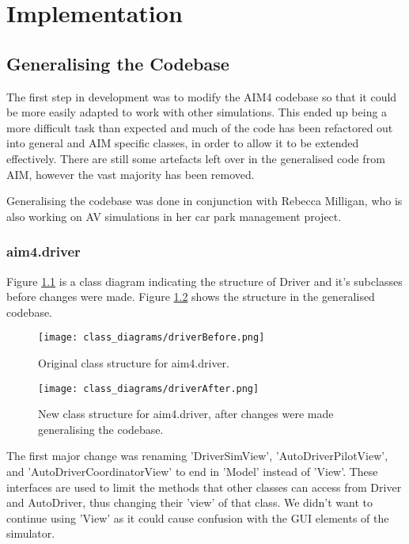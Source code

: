 \chapter{Implementation}
\label{cha:Implementation}

\section{Generalising the Codebase}
\label{sec:Generalising the Codebase}
The first step in development was to modify the AIM4 codebase so that it could be more easily adapted to work with other simulations. This ended up being a more difficult task than expected and much of the code has been refactored out into general and AIM specific classes, in order to allow it to be extended effectively. There are still some artefacts left over in the generalised code from AIM, however the vast majority has been removed. 

Generalising the codebase was done in conjunction with Rebecca Milligan, who is also working on AV simulations in her car park management project.

\subsection{aim4.driver}
\label{subsec:aim4.driver}
Figure \ref{fig:driverBefore} is a class diagram indicating the structure of Driver and it's subclasses before changes were made. Figure \ref{fig:driverAfter} shows the structure in the generalised codebase.

\begin{figure}[htb]
\texttt{[image: class\_diagrams/driverBefore.png]}
\caption{Original class structure for aim4.driver.}
\label{fig:driverBefore}
\end{figure}

\begin{figure}[htb]
\texttt{[image: class\_diagrams/driverAfter.png]}
\caption{New class structure for aim4.driver, after changes were made generalising the codebase.}
\label{fig:driverAfter}
\end{figure}

The first major change was renaming 'DriverSimView', 'AutoDriverPilotView', and 'AutoDriverCoordinatorView' to end in 'Model' instead of 'View'. These interfaces are used to limit the methods that other classes can access from Driver and AutoDriver, thus changing their 'view' of that class. We didn't want to continue using 'View' as it could cause confusion with the GUI elements of the simulator. 


